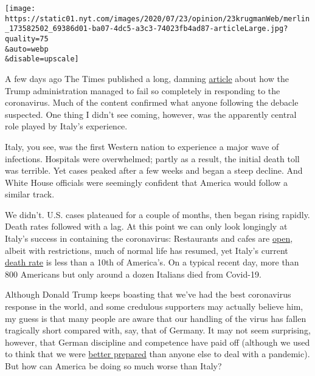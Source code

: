\texttt{[image: https://static01.nyt.com/images/2020/07/23/opinion/23krugmanWeb/merlin\_173582502\_69386d01-ba07-4dc5-a3c3-74023fb4ad87-articleLarge.jpg?quality=75\\\&auto=webp\\\&disable=upscale]}

A few days ago The Times published a long, damning
\href{https://www.nytimes.com/2020/07/18/us/politics/trump-coronavirus-response-failure-leadership.html}{article}
about how the Trump administration managed to fail so completely in
responding to the coronavirus. Much of the content confirmed what anyone
following the debacle suspected. One thing I didn't see coming, however,
was the apparently central role played by Italy's experience.

Italy, you see, was the first Western nation to experience a major wave
of infections. Hospitals were overwhelmed; partly as a result, the
initial death toll was terrible. Yet cases peaked after a few weeks and
began a steep decline. And White House officials were seemingly
confident that America would follow a similar track.

We didn't. U.S. cases plateaued for a couple of months, then began
rising rapidly. Death rates followed with a lag. At this point we can
only look longingly at Italy's success in containing the coronavirus:
Restaurants and cafes are
\href{https://www.washingtonpost.com/travel/2020/06/20/rome-is-ready-visitors-again-its-famous-restaurants-cafes-look-little-different/}{open},
albeit with restrictions, much of normal life has resumed, yet Italy's
current
\href{https://ourworldindata.org/coronavirus-data-explorer?zoomToSelection=true\&casesMetric=true\&dailyFreq=true\&perCapita=true\&smoothing=7\&country=USA~ITA\&pickerMetric=location\&pickerSort=asc}{death
rate} is less than a 10th of America's. On a typical recent day, more
than 800 Americans but only around a dozen Italians died from Covid-19.

Although Donald Trump keeps boasting that we've had the best coronavirus
response in the world, and some credulous supporters may actually
believe him, my guess is that many people are aware that our handling of
the virus has fallen tragically short compared with, say, that of
Germany. It may not seem surprising, however, that German discipline and
competence have paid off (although we used to think that we were
\href{https://www.washingtonpost.com/health/2019/10/24/none-these-countries-us-included-is-fully-prepared-pandemic-report-says/}{better
prepared} than anyone else to deal with a pandemic). But how can America
be doing so much worse than Italy?

